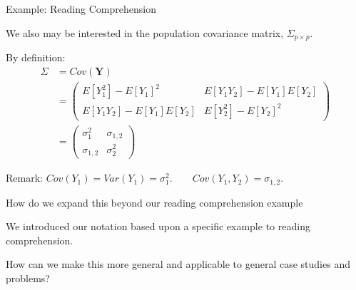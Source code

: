 \documentclass[
  ignorenonframetext,
]{beamer}
\begin{document}
\begin{frame}{Example: Reading Comprehension}
\protect\hypertarget{example-reading-comprehension-3}{}

We also may be interested in the population covariance matrix,
\(\Sigma_{p \times p}.\)

By definition: \begin{align}
\Sigma  
&= Cov(\bm{Y})\\
&=
\left( \begin{array}{cccc}
E[Y_1^2] - E[Y_1]^2 & E[Y_1Y_2] - E[Y_1]E[Y_2] \\
E[Y_1Y_2] - E[Y_1]E[Y_2] & E[Y_2^2] - E[Y_2]^2
\end{array} \right)\\
&=
\left( \begin{array}{cccc}
\sigma_1^2 & \sigma_{1,2} \\
\sigma_{1,2} & \sigma_2^2
\end{array} \right)
\end{align}

Remark:
\(Cov(Y_1) = Var(Y_1) = \sigma_1^2. \qquad Cov(Y_1, Y_2) = \sigma_{1,2}.\)

\end{frame}

\begin{frame}{How do we expand this beyond our reading comprehension
example}
\protect\hypertarget{how-do-we-expand-this-beyond-our-reading-comprehension-example}{}

We introduced our notation based upon a specific example to reading
comprehension.

How can we make this more general and applicable to general case studies
and problems?

\end{frame}
\end{document}
